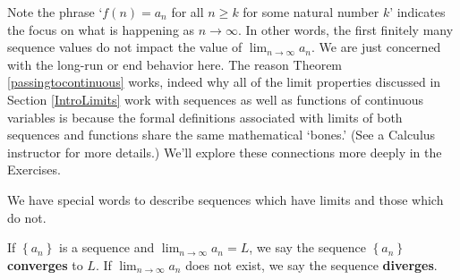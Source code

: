 \documentclass{ximera}
\begin{document}



Note the phrase `$f(n) = a_{n}$  for all $n \geq k$ for some natural number $k$' indicates the focus on what is happening as $n \rightarrow \infty$. In other words, the first finitely many sequence values do not impact the value of $\lim_{n \rightarrow \infty} a_{n}$.  We are just concerned with the long-run or end behavior here.  The reason Theorem \ref{passingtocontinuous}  works, indeed why all of the limit properties discussed in Section \ref{IntroLimits} work with sequences as well as functions of continuous variables is because the formal definitions associated with limits of both sequences and functions share the same mathematical `bones.'  (See a Calculus instructor for more details.) We'll explore these connections more deeply in the Exercises.



We have special words to describe sequences which have limits and those which do not.



\begin{definition} \label{convdiv} If $\left\{ a_{n} \right\}$  is  a sequence and $\lim_{n \rightarrow \infty} a_{n} = L$, we say the sequence $\left\{ a_{n} \right\}$ \textbf{converges} to $L$.  If  $\lim_{n \rightarrow \infty} a_{n}$ does not exist, we say the sequence \textbf{diverges}.

\end{definition}

\end{document}
